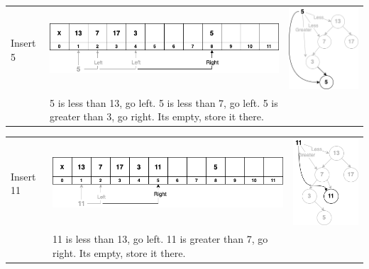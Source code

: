 \begin{center}
\begin{tabular}{|M{0.10\textwidth}|M{0.50\textwidth} M{0.35\textwidth}|}
\hline
Insert 5 &
\includegraphics[scale=.4]{images/binary_tree_array_05.png} & 
\includegraphics[scale=.4]{images/binary_tree_example_05.png}\\
& \footnotesize{5 is less than 13, go left. 5 is less than 7, go left. 5 is greater than 3, go right. Its empty, store it there.} &   \\
\hline
\end{tabular}
\end{center}
\begin{center}
\begin{tabular}{|M{0.10\textwidth}|M{0.50\textwidth} M{0.35\textwidth}|}
\hline
Insert 11 &
\includegraphics[scale=.4]{images/binary_tree_array_06.png} & 
\includegraphics[scale=.4]{images/binary_tree_example_06.png}\\
& \footnotesize{11 is less than 13, go left. 11 is greater than 7, go right. Its empty, store it there.} &   \\
\hline
\end{tabular}
\end{center}
